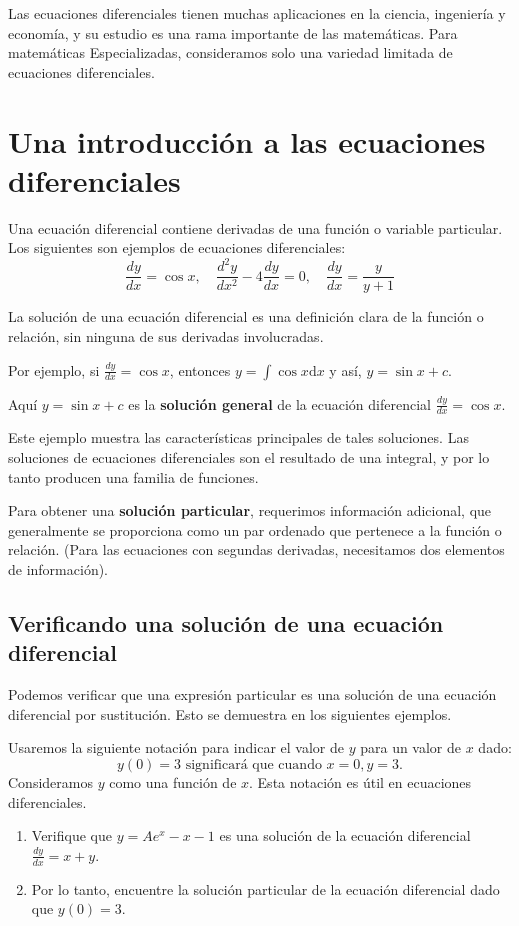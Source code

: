 Las ecuaciones diferenciales tienen muchas aplicaciones en la ciencia, ingeniería y economía, y su estudio es una rama importante de las matemáticas. Para matemáticas Especializadas, consideramos solo una variedad limitada de ecuaciones diferenciales.

\section{Una introducción a las ecuaciones diferenciales}

Una ecuación diferencial contiene derivadas de una función o variable particular. Los siguientes son ejemplos de ecuaciones diferenciales:
\[ \frac{dy}{dx}=\cos x,\quad\frac{d^{2}y}{dx^{2}}-4\frac{dy}{dx}=0,\quad\frac{dy}{dx}=\frac{y}{y+1} \]

La solución de una ecuación diferencial es una definición clara de la función o relación, sin ninguna de sus derivadas involucradas.

Por ejemplo, si $\frac{dy}{dx}=\cos x$, entonces $y=\int\cos x\mathrm{d}x$ y así, $y=\sin x+c$.

Aquí $y=\sin x+c$ es la \textbf{solución general} de la ecuación diferencial $\frac{dy}{dx}=\cos x$.

Este ejemplo muestra las características principales de tales soluciones. Las soluciones de ecuaciones diferenciales son el resultado de una integral, y por lo tanto producen una familia de funciones.

Para obtener una \textbf{solución particular}, requerimos información adicional, que generalmente se proporciona como un par ordenado que pertenece a la función o relación. (Para las ecuaciones con segundas derivadas, necesitamos dos elementos de información).

\subsection{Verificando una solución de una ecuación diferencial}

Podemos verificar que una expresión particular es una solución de una ecuación diferencial por sustitución. Esto se demuestra en los siguientes ejemplos.

Usaremos la siguiente notación para indicar el valor de $y$ para un valor de $x$ dado:
\[ y(0)=3 \text{ significará que cuando }x = 0, y = 3. \]
Consideramos $y$ como una función de $x$. Esta notación es útil en ecuaciones diferenciales.

\begin{example}
	\begin{enumerate}
		\item Verifique que $y=Ae^{x}-x-1$ es una solución de la ecuación diferencial $\frac{dy}{dx}=x+y$.
		\item Por lo tanto, encuentre la solución particular de la ecuación diferencial dado que $y(0)=3$.
	\end{enumerate}
\end{example}

